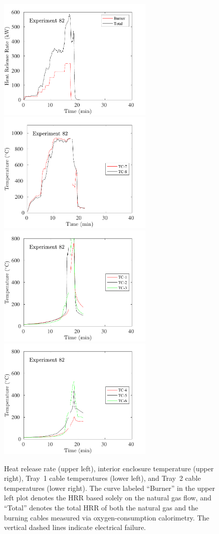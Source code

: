 \begin{figure}[H]
\includegraphics[height=2.30in]{../SCRIPT_FIGURES/Test_82_HRR} \hfill
\includegraphics[height=2.30in]{../SCRIPT_FIGURES/Test_82_TC_7-8} \\
\includegraphics[height=2.30in]{../SCRIPT_FIGURES/Test_82_TC_1-3} \hfill
\includegraphics[height=2.30in]{../SCRIPT_FIGURES/Test_82_TC_4-6}
\caption[HRR and temperatures of Exp.~82]{Heat release rate (upper left), interior enclosure temperature (upper right), Tray~1 cable temperatures (lower left), and Tray~2 cable temperatures (lower right). The curve labeled ``Burner'' in the upper left plot denotes the HRR based solely on the natural gas flow, and ``Total'' denotes the total HRR of both the natural gas and the burning cables measured via oxygen-consumption calorimetry. The vertical dashed lines indicate electrical failure.}
\label{fig:Test_82}
\end{figure}

